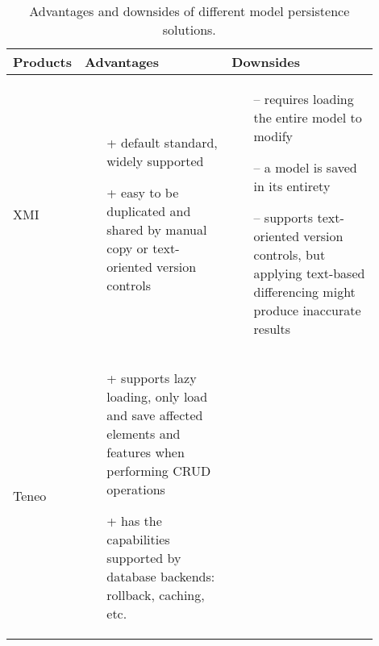 \begin{table*}[]
  \centering
  \caption{Advantages and downsides of different model persistence solutions.}
  \label{table:model_persistence_comparison}
\begin{scriptsize}
  \begin{tabular}{
      |>{\centering\arraybackslash}m{0.1\linewidth}
      |>{\centering\arraybackslash}m{0.4\linewidth}
      |>{\centering\arraybackslash}m{0.4\linewidth}
      |}
    \hline
    \textbf{Products} & \textbf{Advantages} & \textbf{Downsides} \\
    \hline
    XMI 
    &
    \begin{minipage}[t]{\linewidth}
      \raggedright
      \begin{itemize}[leftmargin=7pt]
        \setlength
        \item[+] default standard, widely supported
        \item[+] easy to be duplicated and shared by manual copy or text-oriented version controls
      \end{itemize}
    \end{minipage}
    & 
    \begin{minipage}[t]{\linewidth}
      \raggedright
      \begin{itemize}[leftmargin=5pt]
        \setlength
        \item[--] requires loading the entire model to modify
        \item[--] a model is saved in its entirety
        \item[--] supports text-oriented version controls, but applying text-based differencing might produce inaccurate results    
      \end{itemize}
    \end{minipage}
    \\
    \hline
    Teneo 
    & 
    \begin{minipage}[t]{\linewidth}
      \raggedright
      \begin{itemize}[leftmargin=7pt]
        \setlength
        \item[+] supports lazy loading, only load and save affected elements and features when performing CRUD operations
        \item[+] has the capabilities supported by database backends: rollback, caching, etc. 
      \end{itemize}
    \end{minipage}
    &
    \begin{minipage}[t]{\linewidth}

\end{minipage}
\end{tabular}
\end{scriptsize}
\end{table*}
